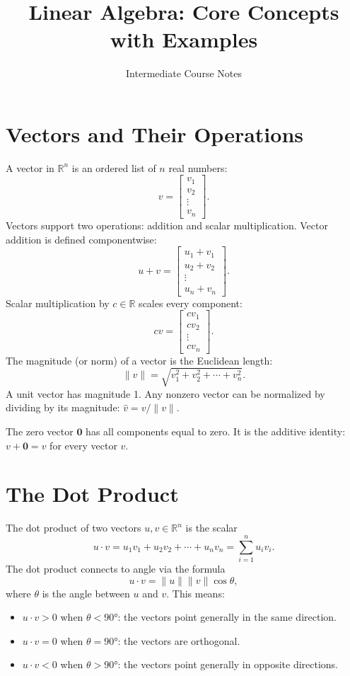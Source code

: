 \documentclass[11pt]{article}
\title{Linear Algebra: Core Concepts with Examples}
\author{Intermediate Course Notes}
\date{}
\begin{document}
\maketitle

\section*{Vectors and Their Operations}

A vector in $\mathbb{R}^n$ is an ordered list of $n$ real numbers:
\[
v = \begin{bmatrix} v_1 \\ v_2 \\ \vdots \\ v_n \end{bmatrix}.
\]
Vectors support two operations: addition and scalar multiplication. Vector addition is defined componentwise:
\[
u + v = \begin{bmatrix} u_1 + v_1 \\ u_2 + v_2 \\ \vdots \\ u_n + v_n \end{bmatrix}.
\]
Scalar multiplication by $c \in \mathbb{R}$ scales every component:
\[
cv = \begin{bmatrix} cv_1 \\ cv_2 \\ \vdots \\ cv_n \end{bmatrix}.
\]
The magnitude (or norm) of a vector is the Euclidean length:
\[
\|v\| = \sqrt{v_1^2 + v_2^2 + \cdots + v_n^2}.
\]
A unit vector has magnitude 1. Any nonzero vector can be normalized by dividing by its magnitude: $\hat{v} = v / \|v\|$.

The zero vector $\mathbf{0}$ has all components equal to zero. It is the additive identity: $v + \mathbf{0} = v$ for every vector $v$.

\section*{The Dot Product}

The dot product of two vectors $u, v \in \mathbb{R}^n$ is the scalar
\[
u \cdot v = u_1 v_1 + u_2 v_2 + \cdots + u_n v_n = \sum_{i=1}^n u_i v_i.
\]
The dot product connects to angle via the formula
\[
u \cdot v = \|u\| \|v\| \cos\theta,
\]
where $\theta$ is the angle between $u$ and $v$. This means:
\begin{itemize}
  \item $u \cdot v > 0$ when $\theta < 90°$: the vectors point generally in the same direction.
  \item $u \cdot v = 0$ when $\theta = 90°$: the vectors are orthogonal.
  \item $u \cdot v < 0$ when $\theta > 90°$: the vectors point generally in opposite directions.
\end{itemize}
\end{document}
